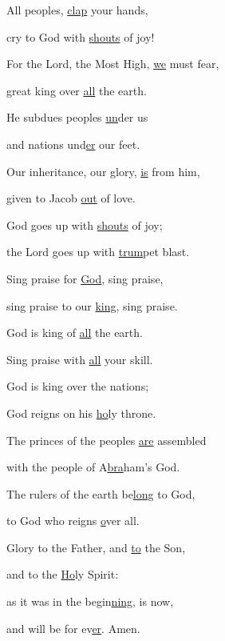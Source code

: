 \noindent All peoples, \uline{clap} your hands,~\GreStar{}~\nopagebreak

cry to God with \uline{shouts} of joy!

\noindent For the Lord, the Most High, \uline{we} must fear,~\GreStar{}~\nopagebreak

great king over \uline{all} the earth.

\noindent He subdues peoples \uline{un}der us~\GreStar{}~\nopagebreak

and nations und\uline{er} our feet.

\noindent Our inheritance, our glory, \uline{is} from him,~\GreStar{}~\nopagebreak

given to Jacob \uline{out} of love.

\noindent God goes up with \uline{shouts} of joy;~\GreStar{}~\nopagebreak

the Lord goes up with \uline{trum}pet blast.

\noindent Sing praise for \uline{God}, sing praise,~\GreStar{}~\nopagebreak

sing praise to our \uline{king}, sing praise.

\noindent God is king of \uline{all} the earth.~\GreStar{}~\nopagebreak

Sing praise with \uline{all} your skill.

\noindent God is king o{ver} the nations;~\GreStar{}~\nopagebreak

God reigns on his \uline{ho}ly throne.

\noindent The princes of the peoples \uline{are} assembled~\GreStar{}~\nopagebreak

with the people of A\uline{bra}ham’s God.

\noindent The rulers of the earth be\uline{long} to God,~\GreStar{}~\nopagebreak

to God who reigns \uline{o}ver all.

\noindent Glory to the Father, and \uline{to} the Son,~\GreStar{}~\nopagebreak

and to the \uline{Ho}ly Spirit:

\noindent as it was in the begin\uline{ning}, is now,~\GreStar{}~\nopagebreak

and will be for ev\uline{er}. Amen.
